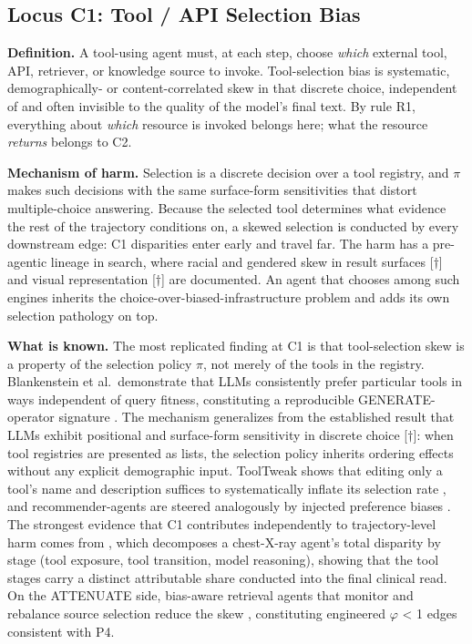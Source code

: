 \documentclass[acmsmall,nonacm]{acmart}
\begin{document}
\subsection{Locus C1: Tool / API Selection Bias}

\textbf{Definition.} A tool-using agent must, at each step, choose \emph{which} external tool, API, retriever, or knowledge source to invoke. Tool-selection bias is systematic, demographically- or content-correlated skew in that discrete choice, independent of and often invisible to the quality of the model's final text. By rule R1, everything about \emph{which} resource is invoked belongs here; what the resource \emph{returns} belongs to C2.

\textbf{Mechanism of harm.} Selection is a discrete decision over a tool registry, and $\pi$ makes such decisions with the same surface-form sensitivities that distort multiple-choice answering. Because the selected tool determines what evidence the rest of the trajectory conditions on, a skewed selection is conducted by every downstream edge: C1 disparities enter early and travel far. The harm has a pre-agentic lineage in search, where racial and gendered skew in result surfaces \cite{u2018algorithms}[$\dagger$] and visual representation \cite{makhortykh2021detecting}[$\dagger$] are documented. An agent that chooses among such engines inherits the choice-over-biased-infrastructure problem and adds its own selection pathology on top.

\textbf{What is known.} The most replicated finding at C1 is that tool-selection skew is a property of the selection policy $\pi$, not merely of the tools in the registry. Blankenstein et al.\ demonstrate that LLMs consistently prefer particular tools in ways independent of query fitness, constituting a reproducible GENERATE-operator signature \cite{blankenstein2025biasbusters}. The mechanism generalizes from the established result that LLMs exhibit positional and surface-form sensitivity in discrete choice \cite{pezeshkpour2023large}[$\dagger$]: when tool registries are presented as lists, the selection policy inherits ordering effects without any explicit demographic input. ToolTweak shows that editing only a tool's name and description suffices to systematically inflate its selection rate \cite{sneh2025tooltweak}, and recommender-agents are steered analogously by injected preference biases \cite{tang2026your}. The strongest evidence that C1 contributes independently to trajectory-level harm comes from \cite{xu2026ducx}, which decomposes a chest-X-ray agent's total disparity by stage (tool exposure, tool transition, model reasoning), showing that the tool stages carry a distinct attributable share conducted into the final clinical read. On the ATTENUATE side, bias-aware retrieval agents that monitor and rebalance source selection reduce the skew \cite{singh2025bias,singh2025biasb}, constituting engineered $\varphi$ < 1 edges consistent with P4.
\end{document}
